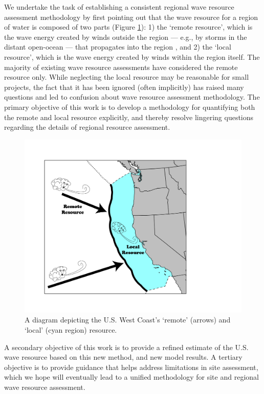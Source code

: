 We undertake the task of establishing a consistent regional wave
resource assessment methodology by first pointing out that the wave
resource for a region of water is composed of two parts (Figure
\ref{fig:diagram:west-eez}): 1) the ‘remote resource’, which is the
wave energy created by winds outside the region — e.g., by storms in
the distant open-ocean — that propagates into the region
\citep{gunnQuantifyingGlobalWave2012,
hemerRevisedAssessmentAustralia2017}, and 2) the ‘local resource’,
which is the wave energy created by winds within the region
itself. The majority of existing wave resource assessments have
considered the remote resource only. While neglecting the local
resource may be reasonable for small projects, the fact that it has
been ignored (often implicitly) has raised many questions and led to
confusion about wave resource assessment methodology. The primary
objective of this work is to develop a methodology for quantifying
both the remote and local resource explicitly, and thereby resolve
lingering questions regarding the details of regional resource
assessment.

\begin{figure}[ht]
  \centering
\includegraphics[width=0.9\linewidth]{../diagram/EEZ_contour03_edit01.png}
  \caption{A diagram depicting the U.S. West Coast’s ‘remote’ (arrows) and ‘local’ (cyan region) resource.}
  \label{fig:diagram:west-eez}
\end{figure}

A secondary objective of this work is to provide a refined estimate of
the U.S. wave resource based on this new method, and new model
results. A tertiary objective is to provide guidance that helps
address limitations in site assessment, which we hope will eventually
lead to a unified methodology for site and regional wave resource
assessment.

